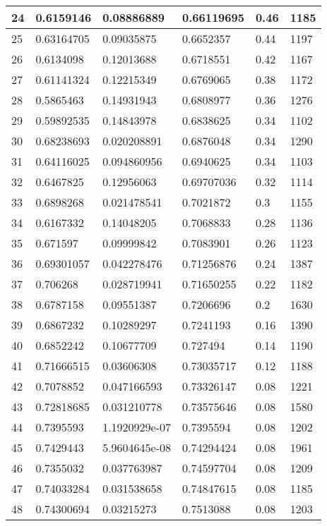 \begin{longtable}{|l|l|l|l|l|l|}
24 & 0.6159146 & 0.08886889 & 0.66119695 & 0.46 & 1185 \\ \hline 
25 & 0.63164705 & 0.09035875 & 0.6652357 & 0.44 & 1197 \\ \hline 
26 & 0.6134098 & 0.12013688 & 0.6718551 & 0.42 & 1167 \\ \hline 
27 & 0.61141324 & 0.12215349 & 0.6769065 & 0.38 & 1172 \\ \hline 
28 & 0.5865463 & 0.14931943 & 0.6808977 & 0.36 & 1276 \\ \hline 
29 & 0.59892535 & 0.14843978 & 0.6838625 & 0.34 & 1102 \\ \hline 
30 & 0.68238693 & 0.020208891 & 0.6876048 & 0.34 & 1290 \\ \hline 
31 & 0.64116025 & 0.094860956 & 0.6940625 & 0.34 & 1103 \\ \hline 
32 & 0.6467825 & 0.12956063 & 0.69707036 & 0.32 & 1114 \\ \hline 
33 & 0.6898268 & 0.021478541 & 0.7021872 & 0.3 & 1155 \\ \hline 
34 & 0.6167332 & 0.14048205 & 0.7068833 & 0.28 & 1136 \\ \hline 
35 & 0.671597 & 0.09999842 & 0.7083901 & 0.26 & 1123 \\ \hline 
36 & 0.69301057 & 0.042278476 & 0.71256876 & 0.24 & 1387 \\ \hline 
37 & 0.706268 & 0.028719941 & 0.71650255 & 0.22 & 1182 \\ \hline 
38 & 0.6787158 & 0.09551387 & 0.7206696 & 0.2 & 1630 \\ \hline 
39 & 0.6867232 & 0.10289297 & 0.7241193 & 0.16 & 1390 \\ \hline 
40 & 0.6852242 & 0.10677709 & 0.727494 & 0.14 & 1190 \\ \hline 
41 & 0.71666515 & 0.03606308 & 0.73035717 & 0.12 & 1188 \\ \hline 
42 & 0.7078852 & 0.047166593 & 0.73326147 & 0.08 & 1221 \\ \hline 
43 & 0.72818685 & 0.031210778 & 0.73575646 & 0.08 & 1580 \\ \hline 
44 & 0.7395593 & 1.1920929e-07 & 0.7395594 & 0.08 & 1202 \\ \hline 
45 & 0.7429443 & 5.9604645e-08 & 0.74294424 & 0.08 & 1961 \\ \hline 
46 & 0.7355032 & 0.037763987 & 0.74597704 & 0.08 & 1209 \\ \hline 
47 & 0.74033284 & 0.031538658 & 0.74847615 & 0.08 & 1185 \\ \hline 
48 & 0.74300694 & 0.03215273 & 0.7513088 & 0.08 & 1203 \\ \hline 

\end{longtable}
